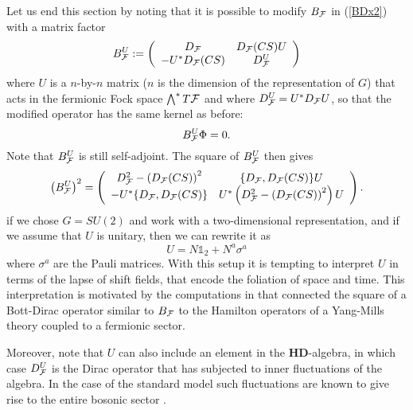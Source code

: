 \documentclass[letterpaper,12pt]{article}
\def\cf{{\cal F}}
\begin{document}
Let us end this section by noting that it is possible to modify $B_\cf$ in (\ref{BDx2}) with a matrix factor
\begin{eqnarray}
B^U_\cf :=   \left(
\begin{array}{cc}
 D_\cf  &  D_\cf(CS) U   \\ 
 -U^*D_\cf(CS)    &  D^U_\cf
\end{array}
\right)
\label{BDx22}
\end{eqnarray}
where $U$ is a $n$-by-$n$ matrix ($n$ is the dimension of the representation of $G$) that acts in the fermionic Fock space $\bigwedge^* T\cf$ and where $D_\cf^U= U^*D_\cf U$, so that the modified operator has the same kernel as before:
$$
B^U_\cf \Phi =0.
$$
Note that $B^U_\cf$ is still self-adjoint. The square of $B^U_\cf$ then gives
$$
\left(B^U_\cf\right)^2 =
\left(
\begin{array}{cc}
D_\cf^2 - \left(D_\cf(CS)\right)^2 & \{D_\cf, D_\cf(CS)\} U
\\
-U^*\{D_\cf, D_\cf(CS)\} & U^*\left( D_\cf^2  - \left(D_\cf(CS)\right)^2 \right) U
\end{array}
\right).
$$
if we chose $G=SU(2)$ and work with a two-dimensional representation, and if we assume that $U$ is unitary, then we can rewrite it as
$$
U = N \mathds{1}_2 + N^a \sigma^a
$$
where $\sigma^a$ are the Pauli matrices. With this setup it is tempting to interpret $U$ in terms of the lapse of shift fields, that encode the foliation of space and time. This interpretation is motivated by the computations in \cite{Aastrup:2020jcf} that connected the square of a Bott-Dirac operator similar to $B_\cf$ to the Hamilton operators of a Yang-Mills theory coupled to a fermionic sector. 

Moreover, note that $U$ can also include an element in the $\mathbf{HD}$-algebra, in which case $D^U_\cf$ is the Dirac operator that has subjected to inner fluctuations of the algebra. In the case of the standard model such fluctuations are known to give rise to the entire bosonic sector \cite{Connes:1996gi}. 
\end{document}
